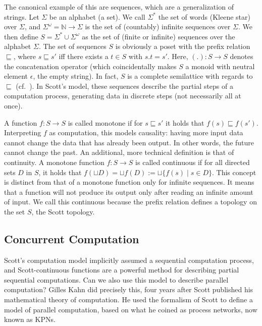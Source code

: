 The canonical example of this are sequences, which are a generalization of strings. Let $\Sigma$ be an alphabet (a set). 
We call $\Sigma^*$ the set of words (Kleene star) over $\Sigma$, and $\Sigma^\omega = \mathbb{N} \rightarrow \Sigma$ is the set of (countably) infinite sequences over $\Sigma$.
We then define $S = \Sigma^* \cup \Sigma^\omega$ as the set of (finite or infinite) sequences over the alphabet $\Sigma$.
The set of sequences $S$ is obviously a \ac{poset} with the prefix relation $\sqsubseteq$, where $s \sqsubseteq s'$ iff there exists a $t \in S$ with $s.t = s'$.
Here, $(.) : S \rightarrow S$ denotes the concatenation operator (which coincidentally makes $S$ a monoid with neutral element $\epsilon$, the empty string).
In fact, $S$ is a complete semilattice with regards to $\sqsubseteq$ (cf.~\cite{lee_matsikoudis_semantics}).
In Scott's model, these sequences describe the partial steps of a computation process, generating data in discrete steps (not necessarily all at once). 

A function $f : S \rightarrow S$ is called monotone if for $s \sqsubseteq s'$ it holds that $f(s) \sqsubseteq f(s')$.
Interpreting $f$ as computation, this models causality: having more input data cannot change the data that has already been output.
In other words, the future cannot change the past.
An additional, more technical definition is that of continuity.
A monotone function $f : S \rightarrow S$ is called continuous if for all directed sets $D$ in $S$, it holds that $f (\sqcup D) = \sqcup f(D) := \sqcup \{ f(s) \mid s \in D \}$.
This concept is distinct from that of a monotone function only for infinite sequences.
It means that a function will not produce its output only after reading an infinite amount of input.
We call this continuous because the prefix relation defines a topology on the set $S$, the Scott topology.

\subsection{Concurrent Computation}
\label{sec:concurrent_mocs}
Scott's computation model implicitly assumed a sequential computation process, and Scott-continuous functions are a powerful method for describing partial sequential computations.
Can we also use this model to describe parallel computation?
Gilles Kahn did precisely this, four years after Scott published his mathematical theory of computation. 
He used the formalism of Scott to define a model of parallel computation, based on what he coined as process networks, now known as \acfp{KPN}\cite{kahn74}.

